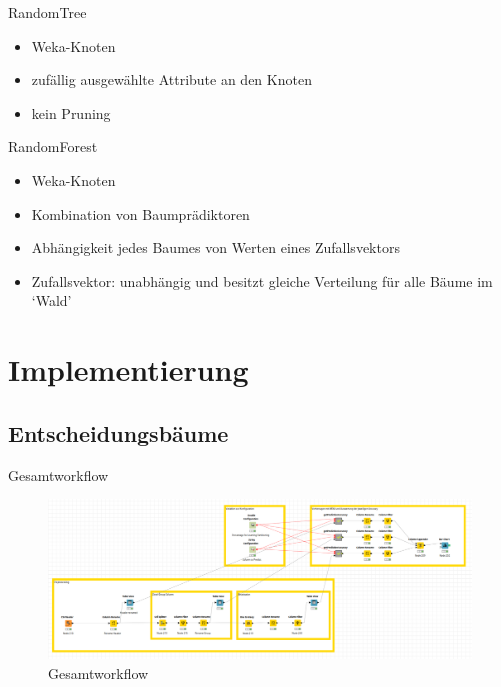 \documentclass[
	handout,
  	aspectratio=169
]{beamer}
\begin{document}
		\begin{frame}{RandomTree}	
			\begin{itemize}
				\item Weka-Knoten
				\item zufällig ausgewählte Attribute an den Knoten
				\item kein Pruning
			\end{itemize}		
		\end{frame}

		\begin{frame}{RandomForest}		
			\begin{itemize}
				\item Weka-Knoten
				\item Kombination von Baumprädiktoren
				\item Abhängigkeit jedes Baumes von Werten eines Zufallsvektors
				\item Zufallsvektor: unabhängig und besitzt gleiche Verteilung für alle Bäume im ‘Wald’
			\end{itemize}	
		\end{frame}

	\section{Implementierung}	
		\subsection{Entscheidungsbäume}
			\begin{frame}{Gesamtworkflow}
				\begin{center}					
					\begin{figure}[h]
						\includegraphics[scale=0.25]{../pictures/trees-workflow-gesamt.png}
						\caption{Gesamtworkflow}		
					\end{figure}	
				\end{center}	
			\end{frame}
			
\end{document}

